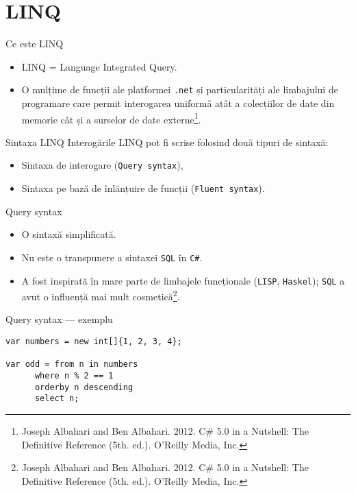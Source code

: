 \documentclass[presentation]{beamer}
\begin{document}
\section{LINQ}
\label{sec:org13ff0e2}
\begin{frame}[label={sec:orgb8451f7},fragile]{Ce este LINQ}
 \begin{itemize}
\item LINQ = Language Integrated Query.
\item O mulțime de funcții ale platformei \texttt{.net} și particularități ale limbajului de programare care permit interogarea uniformă atât a colecțiilor de date din memorie cât și a surselor de date externe\footnote{Joseph Albahari and Ben Albahari. 2012. C\# 5.0 in a Nutshell: The Definitive Reference (5th. ed.). O’Reilly Media, Inc.\label{org4c96399}}.
\end{itemize}
\end{frame}
\begin{frame}[label={sec:org28f5008},fragile]{Sintaxa LINQ}
 Interogările LINQ pot fi scrise folosind două tipuri de sintaxă:
\begin{itemize}
\item Sintaxa de interogare (\texttt{Query syntax}),
\item Sintaxa pe bază de înlănțuire de funcții (\texttt{Fluent syntax}).
\end{itemize}
\end{frame}
\begin{frame}[label={sec:orgb292b01},fragile]{Query syntax}
 \begin{itemize}
\item O sintaxă simplificată.
\item \alert{Nu} este o transpunere a sintaxei \texttt{SQL} în \texttt{C\#}.
\item A fost inspirată în mare parte de limbajele funcționale (\texttt{LISP}, \texttt{Haskel}); \texttt{SQL} a avut o influență mai mult cosmetică\footnote{Joseph Albahari and Ben Albahari. 2012. C\# 5.0 in a Nutshell: The Definitive Reference (5th. ed.). O’Reilly Media, Inc.}.
\end{itemize}
\end{frame}
\begin{frame}[label={sec:org4d0696e},fragile]{Query syntax --- exemplu}
 \begin{verbatim}
var numbers = new int[]{1, 2, 3, 4};

var odd = from n in numbers
	  where n % 2 == 1
	  orderby n descending
	  select n;
\end{verbatim}
\end{frame}
\end{document}
